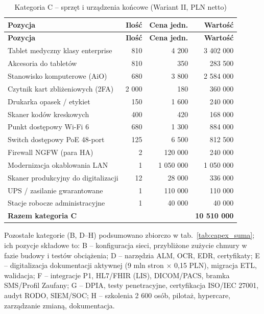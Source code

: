 \begin{longtable}{|L{6.6cm}|r|r|r|}
\caption{Kategoria C -- sprzęt i urządzenia końcowe (Wariant II, PLN netto)}
\label{tab:capex_sprzet} \\
\hline
{}\textbf{Pozycja} & \textbf{Ilość} & \textbf{Cena jedn.} & \textbf{Wartość} \\
\hline
\endfirsthead
\hline 
{}\textbf{Pozycja} & \textbf{Ilość} & \textbf{Cena jedn.} & \textbf{Wartość} \\
\hline
\endhead
Tablet medyczny klasy enterprise & 810 & 4 200 & 3 402 000 \\
\hline
Akcesoria do tabletów & 810 & 350 & 283 500 \\
\hline
Stanowisko komputerowe (AiO) & 680 & 3 800 & 2 584 000 \\
\hline
Czytnik kart zbliżeniowych (2FA) & 2 000 & 180 & 360 000 \\
\hline
Drukarka opasek / etykiet & 150 & 1 600 & 240 000 \\
\hline
Skaner kodów kreskowych & 400 & 420 & 168 000 \\
\hline
Punkt dostępowy Wi-Fi 6 & 680 & 1 300 & 884 000 \\
\hline
Switch dostępowy PoE 48-port & 125 & 6 500 & 812 500 \\
\hline
Firewall NGFW (para HA) & 2 & 120 000 & 240 000 \\
\hline
Modernizacja okablowania LAN & 1 & 1 050 000 & 1 050 000 \\
\hline
Skaner produkcyjny do digitalizacji & 12 & 28 000 & 336 000 \\
\hline
UPS / zasilanie gwarantowane & 1 & 110 000 & 110 000 \\
\hline
Stacje robocze administracyjne & 1 & 40 000 & 40 000 \\
\hline
{}\textbf{Razem kategoria C} & & & \textbf{10 510 000} \\
\hline
\end{longtable}

Pozostałe kategorie (B, D--H) podsumowano zbiorczo w tab.~\ref{tab:capex_suma}; ich pozycje składowe to: B -- konfiguracja sieci, przybliżone zużycie chmury w fazie budowy i testów obciążenia; D -- narzędzia ALM, OCR, EDR, certyfikaty; E -- digitalizacja dokumentacji aktywnej (9 mln stron $\times$ 0,15 PLN), migracja ETL, walidacja; F -- integracje P1, HL7/FHIR (LIS), DICOM/PACS, bramka SMS/Profil Zaufany; G -- DPIA, testy penetracyjne, certyfikacja ISO/IEC 27001, audyt RODO, SIEM/SOC; H -- szkolenia 2 600 osób, pilotaż, hypercare, zarządzanie zmianą, dokumentacja.

